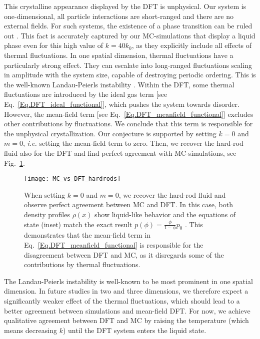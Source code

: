 \documentclass[aps,pre,twocolumn,superscriptaddress,nofootinbib]{revtex4}
\begin{document}
This crystalline appearance displayed by the DFT is unphysical.
Our system is one-dimensional, all particle interactions are short-ranged and there are no external fields. 
For such systems, the existence of a phase transition can be ruled out \cite{Cuesta2004_JStatPhys,Dyson1969_CummunMathPhys,Ruelle1968_CommunMathPhys,VanHove1952_Physica}.
This fact is accurately captured by our MC-simulations that display a liquid phase even for this high value of $k = 40 k_0$, as they explicitly include all effects of thermal fluctuations.
In one spatial dimension, thermal fluctuations have a particularly strong effect. 
They can escalate into long-ranged fluctuations scaling in amplitude with the system size, capable of destroying periodic ordering. 
This is the well-known Landau-Peierls instability \cite{Landau2008_UkrJPhys,Peierls1934_HelvPhysActa,Chaikin2000_book}. 
Within the DFT, some thermal fluctuations are introduced by the ideal gas term [see Eq.~\eqref{Eq.DFT_ideal_functional}], which pushes the system towards disorder. 
However, the mean-field term [see Eq.~\eqref{Eq.DFT_meanfield_functional}] excludes other contributions by fluctuations.
We conclude that this term is responsible for the unphysical crystallization. 
Our conjecture is supported by setting $k = 0$ and $m = 0$, \textit{i.e.} setting the mean-field term to zero.
Then, we recover the hard-rod fluid also for the DFT and find perfect agreement with MC-simulations, see Fig.~\ref{Fig.MC_vs_DFT_hardrods}.
%
\begin{figure}
	\texttt{[image: MC\_vs\_DFT\_hardrods]}
	\caption{When setting $k = 0$ and $m = 0$, we recover the hard-rod fluid and observe perfect agreement between MC and DFT. In this case, both density profiles $\rho(x)$ show liquid-like behavior and the equations of state (inset) match the exact result $p(\phi) = \frac{\phi}{1 - \phi} p_0$ \cite{Percus1976_JStatPhys}. This demonstrates that the mean-field term in Eq.~\eqref{Eq.DFT_meanfield_functional} is responsible for the disagreement between DFT and MC, as it disregards some of the contributions by thermal fluctuations.}
	\label{Fig.MC_vs_DFT_hardrods}
\end{figure}
%

The Landau-Peierls instability is well-known to be most prominent in one spatial dimension. 
In future studies in two and three dimensions, we therefore expect a significantly weaker effect of the thermal fluctuations, which should lead to a better agreement between simulations and mean-field DFT.  
For now, we achieve qualitative agreement between DFT and MC by raising the temperature (which means decreasing $k$) until the DFT system enters the liquid state. 
\end{document}
